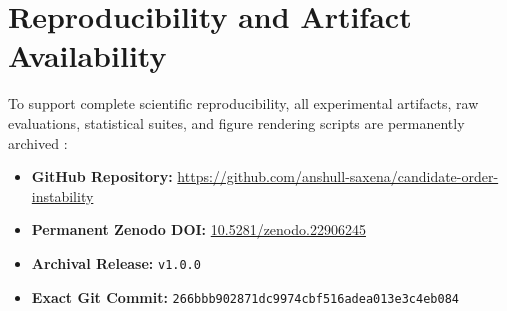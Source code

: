 \documentclass[11pt,a4paper]{article}
\begin{document}
\section*{Reproducibility and Artifact Availability}

To support complete scientific reproducibility, all experimental artifacts, raw evaluations, statistical suites, and figure rendering scripts are permanently archived \citep{saxena2026candidate}:
\begin{itemize}
    \item \textbf{GitHub Repository:} \url{https://github.com/anshull-saxena/candidate-order-instability}
    \item \textbf{Permanent Zenodo DOI:} \href{https://doi.org/10.5281/zenodo.22906245}{10.5281/zenodo.22906245}
    \item \textbf{Archival Release:} \texttt{v1.0.0}
    \item \textbf{Exact Git Commit:} \texttt{266bbb902871dc9974cbf516adea013e3c4eb084}
\end{itemize}



\end{document}
